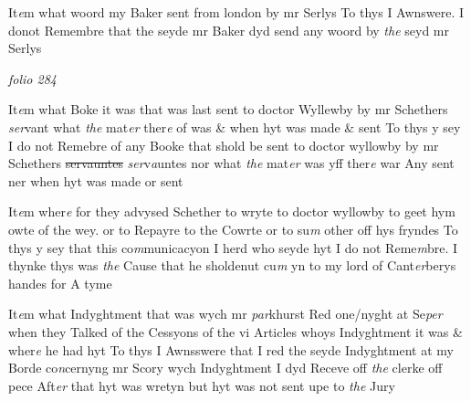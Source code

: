 \documentclass[12pt, a4paper]{book}
\begin{document}
				\marginpar[\vspace{0.5cm}{\textcolor{Gray}{12}}]{}
			

		\ifthenelse{\isodd{\thepage}}
		{\reversemarginpar}
		{\normalmarginpar}
		 It\textit{e}m what woord my Baker sent from london by mr Serlys
To thys I Awnswere. I donot Remembre that the seyde mr Baker
dyd send any woord by \textit{the} seyd mr Serlys

\dotfill
						\newpage
{}

\textit{folio 284}


 	
				\marginpar[\vspace{0.5cm}{\textcolor{Gray}{12}}]{}
			
		\ifthenelse{\isodd{\thepage}}
		{\reversemarginpar}
		{\normalmarginpar}
		
 It\textit{e}m what Boke it was that was last sent to doctor Wyllewby by
mr Schethers \textit{ser}vant what \textit{the} mat\textit{er} ther\textit{e} of was \& when hyt 
was made 
			\& sent
To thys y sey I do not Remebre of any Booke that shold be sent 
to doctor wyllowby by mr Schethers \sout{servauntes }
               \textit{ser}v\textit{a}untes nor what \textit{the}
mat\textit{er} was yff ther\textit{e} war Any sent ner when hyt was made or sent
 	
				\marginpar[\vspace{0.5cm}{\textcolor{Gray}{13}}]{}
			

		\ifthenelse{\isodd{\thepage}}
		{\reversemarginpar}
		{\normalmarginpar}
		 It\textit{e}m wher\textit{e} for they advysed Schether to wryte to doctor wyllowby
to geet hym owte of the wey. or to Repayre to the Cowrte or to su\textit{m}
other off hys fryndes
To thys y sey that this co\textit{m}municacyon I herd who seyde hyt I do not
Reme\textit{m}bre. I thynke thys was \textit{the} Cause that he sholdenut cu\textit{m} yn to my
lord of Cant\textit{er}berys handes for A tyme
 	
				\marginpar[\vspace{0.5cm}{\textcolor{Gray}{14}}]{}
			

		\ifthenelse{\isodd{\thepage}}
		{\reversemarginpar}
		{\normalmarginpar}
		 It\textit{e}m what Indyghtment that was wych mr \textit{par}khurst Red one/nyght
at Se\textit{per} when they Talked of the Cessyons of the vi Articles whoys 
Indyghtment it was \& wher\textit{e} he had hyt
To thys I Awnsswere that I red the seyde Indyghtment at my Borde
co\textit{n}cernyng mr Scory wych Indyghtment I dyd Receve off \textit{the} clerke off 
pece Aft\textit{er} that hyt was wretyn but hyt was not sent upe to \textit{the} Jury
 	
\end{document}
